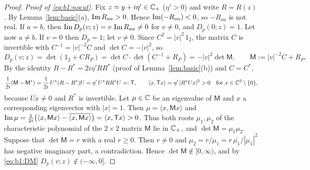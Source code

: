 \begin{proof}
\emph{Proof of \eqref{eq:b1:nocut}.} Fix $z=y+i\eta'\in\mathbb{C}_+$ ($\eta'>0$) and write $R=R(z)$. By Lemma~\ref{lem:basic}(a), $\operatorname{Im} R_{aa}>0$. Hence
$\operatorname{Im}(-R_{aa})<0$, so $-R_{aa}$ is not real. If $a=b$, then $\operatorname{Im} D_p(v;z)=v\,\operatorname{Im} R_{aa}\ne0$ for $v\ne0$, and $D_p(0;z)=1$. Let now $a\ne b$.
If $v=0$ then $D_p=1$; let $v\ne0$. Since $C^2=|v|^2\,1_2$, the matrix $C$ is invertible with $C^{-1}=|v|^{-2}C$ and $\det C=-|v|^2$, so
\begin{equation}\label{eq:b1:DM}
D_p(v;z)=\det(1_2+CR_P)=\det C\cdot\det(C^{-1}+R_P)=-|v|^2\det\mathsf M,\qquad\mathsf M:=|v|^{-2}C+R_P .
\end{equation}
By the identity $R-R^*=2i\eta'RR^*$ (proof of Lemma~\ref{lem:basic}(b)) and $C=C^*$,
\[
\frac1{2i}(\mathsf M-\mathsf M^*)=\frac1{2i}\,U^*(R-R^*)U=\eta'\,U^*RR^*U=:\mathsf T,\qquad
\langle x,\mathsf Tx\rangle=\eta'\,|R^*Ux|^2>0\quad\text{for }x\in\mathbb{C}^2\setminus\{0\},
\]
because $Ux\ne0$ and $R^*$ is invertible. Let $\mu\in\mathbb{C}$ be an eigenvalue of $\mathsf M$ and $x$ a corresponding eigenvector with $|x|=1$. Then
$\mu=\langle x,\mathsf Mx\rangle$ and $\operatorname{Im}\mu=\frac1{2i}\big(\langle x,\mathsf Mx\rangle-\overline{\langle x,\mathsf Mx\rangle}\big)=\langle x,\mathsf Tx\rangle>0$.
Thus both roots $\mu_1,\mu_2$ of the characteristic polynomial of the $2\times2$ matrix $\mathsf M$ lie in $\mathbb{C}_+$, and $\det\mathsf M=\mu_1\mu_2$.
Suppose that $\det\mathsf M=r$ with a real $r\ge0$. Then $r\ne0$ and $\mu_2=r/\mu_1=r\,\overline{\mu_1}/|\mu_1|^2$ has negative imaginary part, a contradiction.
Hence $\det\mathsf M\notin[0,\infty)$, and by \eqref{eq:b1:DM} $D_p(v;z)\notin(-\infty,0]$.
\end{proof}

